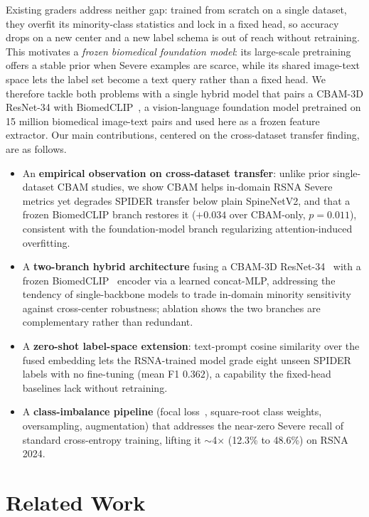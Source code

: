 \documentclass[runningheads]{llncs}
\begin{document}
Existing graders address neither gap: trained from scratch on a single dataset, they overfit its minority-class statistics and lock in a fixed head, so accuracy drops on a new center and a new label schema is out of reach without retraining. This motivates a \emph{frozen biomedical foundation model}: its large-scale pretraining offers a stable prior when Severe examples are scarce, while its shared image-text space lets the label set become a text query rather than a fixed head. We therefore tackle both problems with a single hybrid model that pairs a CBAM-3D ResNet-34 with BiomedCLIP~\cite{zhang2023biomedclip}, a vision-language foundation model pretrained on 15 million biomedical image-text pairs and used here as a frozen feature extractor. Our main contributions, centered on the cross-dataset transfer finding, are as follows.
\begin{itemize}
    \item An \textbf{empirical observation on cross-dataset transfer}: unlike prior single-dataset CBAM studies, we show CBAM helps in-domain RSNA Severe metrics yet degrades SPIDER transfer below plain SpineNetV2, and that a frozen BiomedCLIP branch restores it ($+0.034$ over CBAM-only, $p=0.011$), consistent with the foundation-model branch regularizing attention-induced overfitting.
    \item A \textbf{two-branch hybrid architecture} fusing a CBAM-3D ResNet-34~\cite{woo2018cbam,he2016resnet} with a frozen BiomedCLIP~\cite{zhang2023biomedclip} encoder via a learned concat-MLP, addressing the tendency of single-backbone models to trade in-domain minority sensitivity against cross-center robustness; ablation shows the two branches are complementary rather than redundant.
    \item A \textbf{zero-shot label-space extension}: text-prompt cosine similarity over the fused embedding lets the RSNA-trained model grade eight unseen SPIDER labels with no fine-tuning (mean F1 $0.362$), a capability the fixed-head baselines lack without retraining.
    \item A \textbf{class-imbalance pipeline} (focal loss~\cite{lin2017focal}, square-root class weights, oversampling, augmentation) that addresses the near-zero Severe recall of standard cross-entropy training, lifting it $\sim$4$\times$ (12.3\% to 48.6\%) on RSNA 2024.
\end{itemize}

\section{Related Work}\label{sec2}
\end{document}
